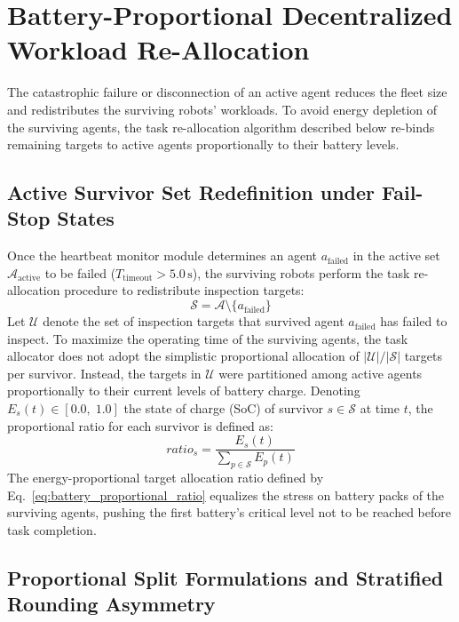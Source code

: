 \section{Battery-Proportional Decentralized Workload Re-Allocation}\label{sec:ch6_battery_realloc}

The catastrophic failure or disconnection of an active agent reduces the fleet size and redistributes the surviving robots' workloads. To avoid energy depletion of the surviving agents, the task re-allocation algorithm described below re-binds remaining targets to active agents proportionally to their battery levels.

\subsection{Active Survivor Set Redefinition under Fail-Stop States}

Once the heartbeat monitor module determines an agent $a_{\text{failed}}$ in the active set $\mathcal{A}_{\text{active}}$ to be failed ($T_{\text{timeout}} > 5.0\,\text{s}$), the surviving robots perform the task re-allocation procedure to redistribute inspection targets:
\begin{equation} \mathcal{S} = \mathcal{A} \setminus \{ a_{\text{failed}} \} \label{eq:survivor_set_redefinition} \end{equation}
Let $\mathcal{U}$ denote the set of inspection targets that survived agent $a_{\text{failed}}$ has failed to inspect. To maximize the operating time of the surviving agents, the task allocator does not adopt the simplistic proportional allocation of $\lvert\mathcal{U}\rvert / \lvert\mathcal{S}\rvert$ targets per survivor. Instead, the targets in $\mathcal{U}$ were partitioned among active agents proportionally to their current levels of battery charge. Denoting $E_s(t) \in [0.0, \; 1.0]$ the state of charge (SoC) of survivor $s \in \mathcal{S}$ at time $t$, the proportional ratio for each survivor is defined as:
\begin{equation} ratio_s = \frac{E_s(t)}{\sum_{p \in \mathcal{S}} E_p(t)} \label{eq:battery_proportional_ratio} \end{equation}
The energy-proportional target allocation ratio defined by Eq.~\ref{eq:battery_proportional_ratio} equalizes the stress on battery packs of the surviving agents, pushing the first battery's critical level not to be reached before task completion.

\subsection{Proportional Split Formulations and Stratified Rounding Asymmetry}

